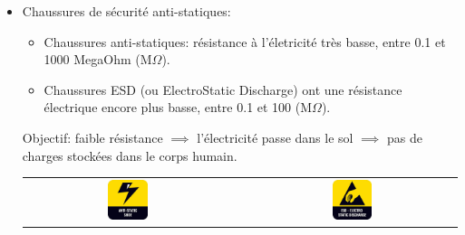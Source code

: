 \documentclass[a4paper]{article}
\begin{document}
\begin{itemize}
\item Chaussures de sécurité anti-statiques:
\begin{itemize}
    \item Chaussures anti-statiques: résistance à l’életricité très basse, entre 0.1 et 1000 MegaOhm (M$ \Omega $).
    \item Chaussures ESD (ou ElectroStatic Discharge) ont une résistance électrique encore plus basse, entre 0.1 et 100 (M$ \Omega $).
\end{itemize}
Objectif: faible résistance $ \implies $ l'électricité passe dans le sol $ \implies $ pas de charges stockées dans le corps humain.
\begin{center}
\begin{tabular}{c c c}
    \includegraphics[width=0.2\textwidth]{images/chaussures-anti-statiques.jpg}
    &&
    \includegraphics[width=0.2\textwidth]{images/chaussures-ESD.jpg}
\end{tabular}
\end{center}






\end{itemize}
\end{document}
